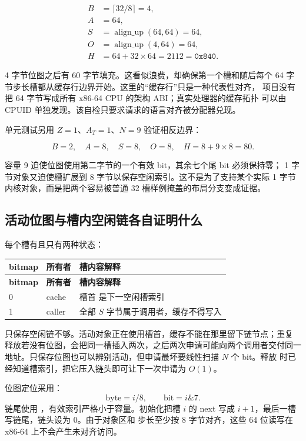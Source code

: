 \[
\begin{aligned}
B&=\lceil32/8\rceil=4,\\
A&=64,\\
S&=\operatorname{align\_up}(64,64)=64,\\
O&=\operatorname{align\_up}(4,64)=64,\\
H&=64+32\times64=2112=\mathtt{0x840}.
\end{aligned}
\]

4 字节位图之后有 60 字节填充。这看似浪费，却确保第一个槽和随后每个
64 字节步长槽都从缓存行边界开始。这里的“缓存行”只是一种代表性对齐，
项目没有把 64 字节写成所有 x86-64 CPU 的架构 ABI；真实处理器的缓存拓扑
可以由 CPUID 单独发现。该自检只要求请求的语言对齐被分配器兑现。

单元测试另用 \(Z=1\)、\(A_T=1\)、\(N=9\) 验证相反边界：

\[
B=2,\quad A=8,\quad S=8,\quad O=8,\quad H=8+9\times8=80.
\]

容量 9 迫使位图使用第二字节的一个有效 bit，其余七个尾 bit 必须保持零；
1 字节对象又迫使槽扩展到 8 字节以保存空闲索引。这不是为了支持某个实际
1 字节内核对象，而是把两个容易被普通 32 槽样例掩盖的布局分支变成证据。

\subsection{活动位图与槽内空闲链各自证明什么}

每个槽有且只有两种状态：

\begin{longtable}{L{0.14\textwidth}L{0.22\textwidth}L{0.50\textwidth}}
\toprule
\textbf{bitmap} & \textbf{所有者} & \textbf{槽内容解释}\\
\midrule
\endfirsthead
\toprule
\textbf{bitmap} & \textbf{所有者} & \textbf{槽内容解释}\\
\midrule
{} & cache & 槽首  是下一空闲槽索引\\
1 & caller & 全部 \(S\) 字节属于调用者，缓存不得写入\\
\bottomrule
\end{longtable}

只保存空闲链不够。活动对象正在使用槽首，缓存不能在那里留下链节点；重复
释放若没有位图，会把同一槽插入两次，之后两次申请可能向两个调用者交付同一
地址。只保存位图也可以辨别活动，但申请最坏要线性扫描 \(N\) 个 bit。释放
时已经知道槽索引，把它压入链头即可让下一次申请为 \(O(1)\)。

位图定位采用：
\[
  \mathrm{byte}=i/8,\qquad
  \mathrm{bit}=i\mathbin{\&}7.
\]
链尾使用 ，有效索引严格小于容量。初始化把槽
\(i\) 的 next 写成 \(i+1\)，最后一槽写链尾，链头设为 0。由于对象区和
步长至少按 8 字节对齐，这些 64 位读写在 x86-64 上不会产生未对齐访问。

